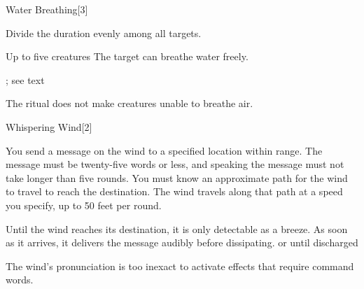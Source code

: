 \begin{spellsection}{Water Breathing}[3]
    \begin{spellheader}
    \end{spellheader}
    \begin{spellcontent}
        \begin{spelltargetinginfo}
        \end{spelltargetinginfo}
        \begin{spelleffects}

            \spellspecial Divide the duration evenly among all targets.
            \begin{spelltargets}{Up to five creatures}
                \spelleffect The target can breathe water freely.
            \end{spelltargets}
            \spelldur \durext \dismissable; see text
        \end{spelleffects}
    \end{spellcontent}
    \begin{spellfooter}
        \spellnotes The ritual does not make creatures unable to breathe air.
    \end{spellfooter}
\end{spellsection}

\begin{spellsection}{Whispering Wind}[2]
    \begin{spellheader}
    \end{spellheader}
    \begin{spellcontent}
        \begin{spelltargetinginfo}
        \end{spelltargetinginfo}
        \begin{spelleffects}

            \spelleffect You send a message on the wind to a specified location within range. The message must be twenty-five words or less, and speaking the message must not take longer than five rounds. You must know an approximate path for the wind to travel to reach the destination. The wind travels along that path at a speed you specify, up to 50 feet per round.

            Until the wind reaches its destination, it is only detectable as a breeze. As soon as it arrives, it delivers the message audibly before dissipating.
            \spelldur \durext or until discharged
        \end{spelleffects}
    \end{spellcontent}
    \begin{spellfooter}
        \spellnotes The wind's pronunciation is too inexact to activate effects that require command words.
    \end{spellfooter}
\end{spellsection}

